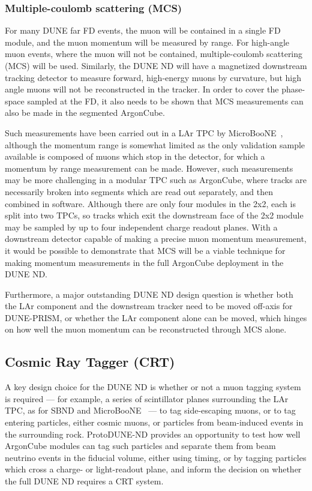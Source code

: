 \subsubsection{Multiple-coulomb scattering (MCS)}
For many DUNE far FD events, the muon will be contained in a single FD module, and the muon momentum will be measured by range. For high-angle muon events, where the muon will not be contained, multiple-coulomb scattering (MCS) will be used. Similarly, the DUNE ND will have a magnetized downstream tracking detector to measure forward, high-energy muons by curvature, but high angle muons will not be reconstructed in the tracker. In order to cover the phase-space sampled at the FD, it also needs to be shown that MCS measurements can also be made in the segmented ArgonCube.

Such measurements have been carried out in a LAr TPC by MicroBooNE~\cite{Abratenko:2017nki}, although the momentum range is somewhat limited as the only validation sample available is composed of muons which stop in the detector, for which a momentum by range measurement can be made. However, such measurements may be more challenging in a modular TPC such as ArgonCube, where tracks are necessarily broken into segments which are read out separately, and then combined in software. Although there are only four modules in the 2x2, each is split into two TPCs, so tracks which exit the downstream face of the 2x2 module may be sampled by up to four independent charge readout planes. With a downstream detector capable of making a precise muon momentum measurement, it would be possible to demonstrate that MCS will be a viable technique for making momentum measurements in the full ArgonCube deployment in the DUNE ND.

Furthermore, a major outstanding DUNE ND design question is whether both the LAr component and the downstream tracker need to be moved off-axis for DUNE-PRISM, or whether the LAr component alone can be moved, which hinges on how well the muon momentum can be reconstructed through MCS alone.

\subsection{Cosmic Ray Tagger (CRT)}
A key design choice for the DUNE ND is whether or not a muon tagging system is required --- for example, a series of scintillator planes surrounding the LAr TPC, as for SBND and MicroBooNE~\cite{CRT} --- to tag side-escaping muons, or to tag entering particles, either cosmic muons, or particles from beam-induced events in the surrounding rock. ProtoDUNE-ND provides an opportunity to test how well ArgonCube modules can tag such particles and separate them from beam neutrino events in the fiducial volume, either using timing, or by tagging particles which cross a charge- or light-readout plane, and inform the decision on whether the full DUNE ND requires a CRT system.

